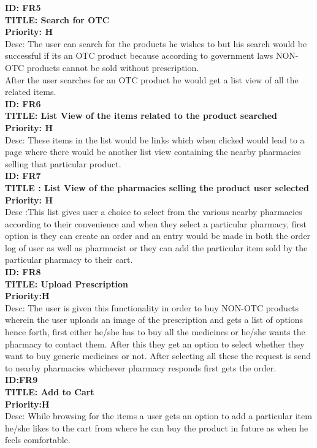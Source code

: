 \documentclass{scrreprt}
\begin{document}
\textbf{ID: FR5}\\
 \textbf{TITLE: Search for OTC}\\
 \textbf{Priority: H}\\
Desc: The user can search for the products he wishes to but his search would be successful if its an OTC product because according to government laws NON-OTC products cannot be sold without prescription.\\
After the user searches for an OTC product he would get a list view of all the related items.\\

 \textbf{ID: FR6}\\
 \textbf{TITLE: List View of the items related to the product searched}\\
\textbf{Priority: H}\\
Desc: These items in the list would be links which when clicked would lead to a page where there would be another list view containing the nearby pharmacies selling that particular product.\\

 \textbf{ID: FR7}\\
 \textbf{TITLE : List View of the pharmacies selling the product user selected}\\
 \textbf{Priority: H}\\
Desc :This list gives user a choice to select from the various nearby pharmacies according to their convenience and when they select a particular pharmacy, first option is they can create an order and an entry would be made in both the order log of user as well as pharmacist or they can add the particular item sold by the particular pharmacy to their cart.\\

 \textbf{ID: FR8}\\
 \textbf{TITLE: Upload Prescription}\\
\textbf{Priority:H}\\
Desc: The user is given this functionality in order to buy NON-OTC products wherein the user uploads an image of the prescription and gets a list of options hence forth, first either he/she has to buy all the medicines or he/she wants the pharmacy to contact them. After this they get an option to select whether they want to buy generic medicines or not. After selecting all these the request is send to nearby pharmacies whichever pharmacy responds first gets the order.\\

\textbf{ID:FR9}\\
 \textbf{TITLE: Add to Cart}\\
 \textbf{Priority:H}\\
Desc: While browsing for the items a user gets an option to add a particular item he/she likes to the cart from where he can buy the product in future as when he feels comfortable.\\
\end{document}
